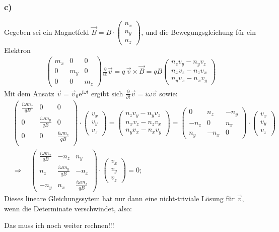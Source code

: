 \subsubsection*{c)}
Gegeben sei ein Magnetfeld $\vec B = B \cdot \begin{pmatrix} n_x \\n_y \\n_z \end{pmatrix}$,
und die Bewegungsgleichung für ein Elektron
\begin{align*}
\begin{pmatrix} m_x&0&0 \\0&m_y&0 \\0&0&m_z\end{pmatrix} \frac{\partial}{\partial t} \vec v=
 q \, \vec v \times \vec B = q B \begin{pmatrix}n_z v_y - n_y v_z \\ n_x v_z - n_z v_x \\ n_y v_x - n_x v_y\end{pmatrix}
\end{align*}
Mit dem Ansatz $\vec v = \vec v_0 \mathrm e^{i \omega t}$ ergibt sich
$\frac{\partial}{\partial t} \vec v = i \omega \vec v$ sowie:
\begin{align*}
& \begin{pmatrix}\frac{i \omega m_x}{q B}&0&0\\0&\frac{i \omega m_y}{q B}&0\\0&0&\frac{i \omega m_z}{q B}\\\end{pmatrix}
  \cdot \begin{pmatrix}v_x\\v_y\\v_z\end{pmatrix} =
  \begin{pmatrix}n_z v_y - n_y v_z \\ n_x v_z - n_z v_x \\ n_y v_x - n_x v_y\end{pmatrix} =
  \begin{pmatrix}0 & n_z &  - n_y \\ -n_z & 0 & n_x \\ n_y & -n_x & 0 \end{pmatrix}
  \cdot \begin{pmatrix}v_x\\v_y\\v_z\end{pmatrix} \\
&\Rightarrow \quad \begin{pmatrix}\frac{i \omega m_x}{q B}&-n_z& n_y \\
n_z&\frac{i \omega m_y}{q B}&-n_x \\ -n_y&n_x&\frac{i \omega m_z}{q B} \end{pmatrix}
  \cdot \begin{pmatrix}v_x\\v_y\\v_z\end{pmatrix} = 0;
\end{align*}
Dieses lineare Gleichungssytem hat nur dann eine nicht-triviale Lösung für $\vec v$,
wenn die Determinate verschwindet, also:

Das muss ich noch weiter rechnen!!!


